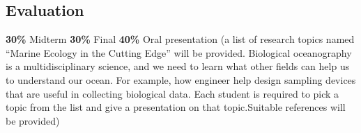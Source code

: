 \documentclass[
]{article}
\begin{document}
\hypertarget{evaluation}{%
\subsection{Evaluation}\label{evaluation}}

\textbf{30\%} Midterm \textbf{30\%} Final \textbf{40\%} Oral
presentation (a list of research topics named ``Marine Ecology in the
Cutting Edge'' will be provided. Biological oceanography is a
multidisciplinary science, and we need to learn what other fields can
help us to understand our ocean. For example, how engineer help design
sampling devices that are useful in collecting biological data. Each
student is required to pick a topic from the list and give a
presentation on that topic.Suitable references will be provided)
\end{document}
